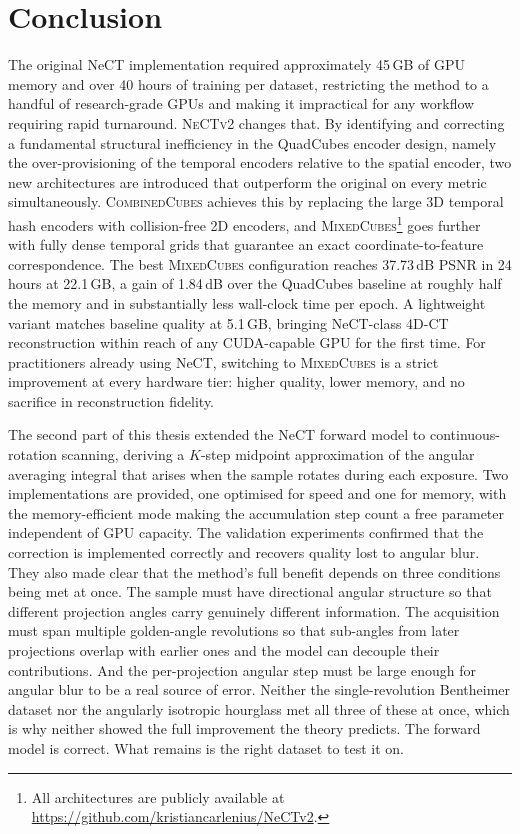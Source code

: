 \documentclass[12pt, a4paper, twoside]{report}
\newcommand{\NeCTv}{\textsc{NeCTv2}}
\newcommand{\MixedCubes}{\textsc{MixedCubes}}
\newcommand{\CombinedCubes}{\textsc{CombinedCubes}}
\begin{document}
\chapter{Conclusion}
\label{chap:conclusion}

The original NeCT implementation required approximately 45\,GB of GPU memory and over 40 hours of training per dataset, restricting the method to a handful of research-grade GPUs and making it impractical for any workflow requiring rapid turnaround. \NeCTv{} changes that. By identifying and correcting a fundamental structural inefficiency in the QuadCubes encoder design, namely the over-provisioning of the temporal encoders relative to the spatial encoder, two new architectures are introduced that outperform the original on every metric simultaneously. \CombinedCubes{} achieves this by replacing the large 3D temporal hash encoders with collision-free 2D encoders, and \MixedCubes{}\footnote{All architectures are publicly available at \url{https://github.com/kristiancarlenius/NeCTv2}.} goes further with fully dense temporal grids that guarantee an exact coordinate-to-feature correspondence. The best \MixedCubes{} configuration reaches 37.73\,dB PSNR in 24 hours at 22.1\,GB, a gain of 1.84\,dB over the QuadCubes baseline at roughly half the memory and in substantially less wall-clock time per epoch. A lightweight variant matches baseline quality at 5.1\,GB, bringing NeCT-class 4D-CT reconstruction within reach of any CUDA-capable GPU for the first time. For practitioners already using NeCT, switching to \MixedCubes{} is a strict improvement at every hardware tier: higher quality, lower memory, and no sacrifice in reconstruction fidelity.

The second part of this thesis extended the NeCT forward model to continuous-rotation scanning, deriving a $K$-step midpoint approximation of the angular averaging integral that arises when the sample rotates during each exposure. Two implementations are provided, one optimised for speed and one for memory, with the memory-efficient mode making the accumulation step count a free parameter independent of GPU capacity. The validation experiments confirmed that the correction is implemented correctly and recovers quality lost to angular blur. They also made clear that the method's full benefit depends on three conditions being met at once. The sample must have directional angular structure so that different projection angles carry genuinely different information. The acquisition must span multiple golden-angle revolutions so that sub-angles from later projections overlap with earlier ones and the model can decouple their contributions. And the per-projection angular step must be large enough for angular blur to be a real source of error. Neither the single-revolution Bentheimer dataset nor the angularly isotropic hourglass met all three of these at once, which is why neither showed the full improvement the theory predicts. The forward model is correct. What remains is the right dataset to test it on.
\end{document}
